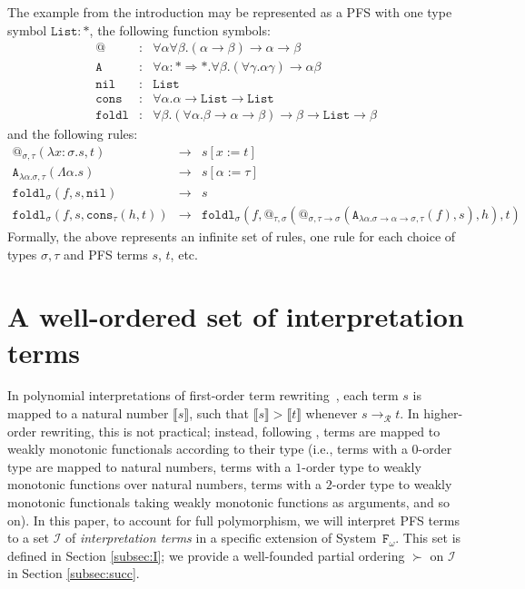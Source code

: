 \documentclass[a4paper,UKenglish,cleveref,autoref,numberwithinsect]{lipics-v2019}
\theoremstyle{definition}
\newcommand{\Fomega}{\mathtt{F}_\omega}
\newcommand{\Rules}{\mathcal{R}}
\newcommand{\Iterms}{\mathcal{I}}
\newcommand{\arrkind}{\Rightarrow}
\newcommand{\arrtype}{\rightarrow}
\newcommand{\abs}[2]{\lambda #1.#2}
\newcommand{\tabs}[2]{\Lambda #1.#2}
\newcommand{\arr}[1]{\longrightarrow_{#1}}
\newcommand{\red}{\longrightarrow}
\newcommand{\interpret}[1]{\llbracket #1 \rrbracket}
\newcommand{\List}{\mathtt{List}}
\newcommand{\nil}{\mathtt{nil}}
\newcommand{\cons}{\mathtt{cons}}
\begin{document}
\begin{example}\label{ex_fold_pafs}
  The example from the introduction may be represented as a PFS with
  one type symbol $\mathtt{List} : *$, the following function symbols:
  \[
  \begin{array}{rcl}
    @ & : & \forall \alpha \forall \beta . (\alpha \arrtype \beta) \arrtype \alpha \arrtype \beta \\
    \mathtt{A} & : & \forall \alpha : * \arrkind * . \forall \beta .
    (\forall \gamma .\alpha \gamma) \arrtype \alpha \beta \\
    \mathtt{nil} & : & \List \\
    \mathtt{cons} & : & \forall \alpha . \alpha \arrtype \List \arrtype \List \\
    \mathtt{foldl} & : & \forall \beta . (\forall \alpha . \beta \arrtype \alpha \arrtype \beta) \arrtype \beta \arrtype \List \arrtype \beta
  \end{array}
  \]
  and the following rules:
  \[
  \begin{array}{rcl}
    @_{\sigma,\tau}(\abs{x:\sigma}{s},t) & \red & s[x:=t] \\
    \mathtt{A}_{\abs{\alpha}{\sigma},\tau}(\tabs{\alpha}{s}) & \red &
    s[\alpha:=\tau] \\
    \mathtt{foldl}_\sigma(f,s,\nil) & \red & s \\
    \mathtt{foldl}_\sigma(f,s,\cons_\tau(h,t)) & \red & \mathtt{foldl}_\sigma(f,@_{\tau,\sigma}(@_{\sigma,\tau
    \arrtype\sigma}(\mathtt{A}_{\abs{\alpha}{\sigma\arrtype\alpha\arrtype\sigma},\tau}(f),s),h),t)
  \end{array}
  \]
  Formally, the above represents an infinite set of rules, one rule for
  each choice of types $\sigma,\tau$ and PFS terms $s$, $t$, etc.
\end{example}

\section{A well-ordered set of interpretation terms}\label{sec:World}

In polynomial interpretations of first-order term
rewriting~\cite[Chapter 6.2]{Terese2003}, each term $s$ is mapped to a
natural number $\interpret{s}$, such that $\interpret{s} > \interpret{t}$
whenever $s \arr{\Rules} t$.  In higher-order rewriting, this is not
practical; instead, following \cite{pol:96}, terms are mapped to weakly
monotonic functionals according to their type (i.e., terms with a $0$-order
type are mapped to natural numbers, terms with a $1$-order type to weakly
monotonic functions over natural numbers, terms with a $2$-order type to
weakly monotonic functionals taking weakly monotonic functions as
arguments, and so on).  In this paper, to account for full polymorphism,
we will interpret PFS terms to a set $\Iterms$ of \emph{interpretation terms}
in a specific extension of System~$\Fomega$.  This set is defined in Section
\ref{subsec:I}; we provide a well-founded partial ordering $\succ$ on
$\Iterms$ in Section \ref{subsec:succ}.
\end{document}
